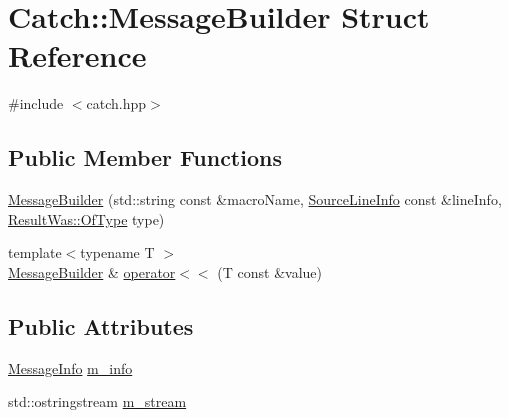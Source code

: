 \hypertarget{structCatch_1_1MessageBuilder}{\section{Catch\-:\-:Message\-Builder Struct Reference}
\label{structCatch_1_1MessageBuilder}
}


{\ttfamily \#include $<$catch.\-hpp$>$}

\subsection*{Public Member Functions}
\begin{DoxyCompactItemize}
\item 
\hyperlink{structCatch_1_1MessageBuilder_ab0c6378e722680bf58852c6ee2b6e724}{Message\-Builder} (std\-::string const \&macro\-Name, \hyperlink{structCatch_1_1SourceLineInfo}{Source\-Line\-Info} const \&line\-Info, \hyperlink{structCatch_1_1ResultWas_a624e1ee3661fcf6094ceef1f654601ef}{Result\-Was\-::\-Of\-Type} type)
\item 
{\footnotesize template$<$typename T $>$ }\\\hyperlink{structCatch_1_1MessageBuilder}{Message\-Builder} \& \hyperlink{structCatch_1_1MessageBuilder_a20fa48d069b20dddcc2d3df8abb123c1}{operator$<$$<$} (T const \&value)
\end{DoxyCompactItemize}
\subsection*{Public Attributes}
\begin{DoxyCompactItemize}
\item 
\hyperlink{structCatch_1_1MessageInfo}{Message\-Info} \hyperlink{structCatch_1_1MessageBuilder_a979f1c2b36d78f80ee275bfa5ba0209f}{m\-\_\-info}
\item 
std\-::ostringstream \hyperlink{structCatch_1_1MessageBuilder_a6488ab0cc4ea52affc9c0612c7c5df6b}{m\-\_\-stream}
\end{DoxyCompactItemize}


